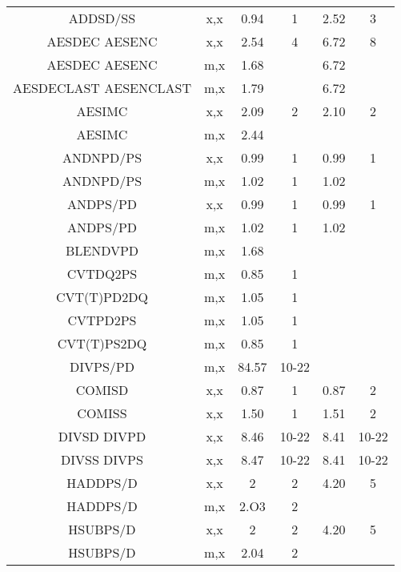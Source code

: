 \documentclass[11pt,a4paper]{article}
\begin{document}
\begin{center}
\begin{tabular}{|c|c|c|c|c|c|}
ADDSD/SS & x,x & 0.94 & 1 & 2.52 & 3 \\
AESDEC AESENC & x,x & 2.54 & 4 & 6.72 & 8 \\
AESDEC AESENC & m,x & 1.68 &  & 6.72 &  \\
AESDECLAST AESENCLAST & m,x & 1.79 &  & 6.72  &  \\
AESIMC & x,x & 2.09 & 2 & 2.10 & 2 \\
AESIMC & m,x & 2.44 &  &  &  \\
ANDNPD/PS & x,x & 0.99 & 1 & 0.99 & 1 \\
ANDNPD/PS & m,x & 1.02 & 1 & 1.02 &  \\
ANDPS/PD & x,x & 0.99 & 1 & 0.99 & 1 \\
ANDPS/PD & m,x & 1.02 & 1 & 1.02 &  \\
BLENDVPD & m,x & 1.68 &  &  &  \\
CVTDQ2PS & m,x & 0.85 & 1 &  &  \\
CVT(T)PD2DQ & m,x & 1.05 & 1 &  &  \\
CVTPD2PS & m,x & 1.05 & 1 &  &  \\
CVT(T)PS2DQ & m,x & 0.85 & 1 &  &  \\
DIVPS/PD & m,x & 84.57 & 10-22 &  &  \\
COMISD & x,x & 0.87 & 1 & 0.87 & 2 \\
COMISS & x,x & 1.50 & 1 & 1.51 & 2 \\
DIVSD DIVPD & x,x & 8.46 & 10-22 & 8.41 & 10-22 \\
DIVSS DIVPS & x,x & 8.47 & 10-22 & 8.41 & 10-22 \\
HADDPS/D & x,x & 2 & 2 & 4.20 & 5 \\
HADDPS/D & m,x & 2.O3 & 2 &  &  \\
HSUBPS/D & x,x & 2 & 2 & 4.20 & 5 \\
HSUBPS/D & m,x & 2.04 & 2 &  &  \\
\hline
\end{tabular}
\end{center}
\newpage
\end{document}

